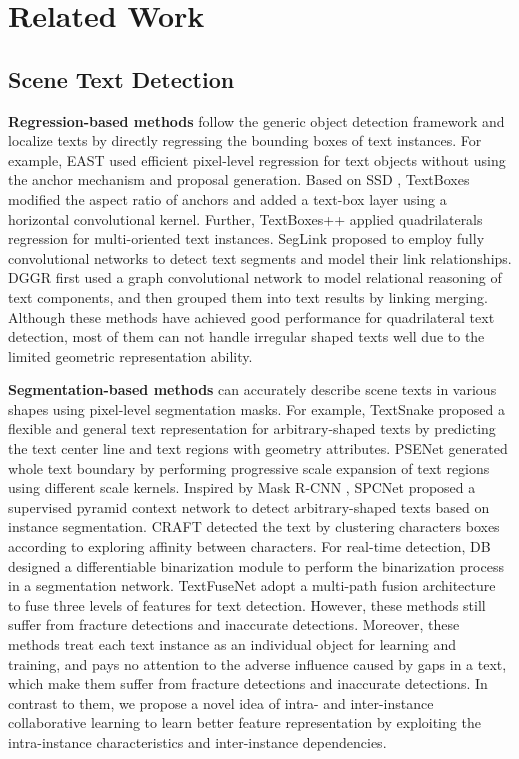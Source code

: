 \section{Related Work}
\subsection{Scene Text Detection}

\textbf{Regression-based methods} follow the generic object detection framework and localize texts by directly regressing the bounding boxes of text instances. For example, EAST \citep{east} used efficient pixel-level regression for text objects without using the anchor mechanism and proposal generation. Based on SSD \citep{ssd}, TextBoxes \citep{textboxes} modified the aspect ratio of anchors and added a text-box layer using a horizontal convolutional kernel. Further, TextBoxes++ \citep{textboxes++} applied quadrilaterals regression for multi-oriented text instances. SegLink \citep{seglink} proposed to employ fully convolutional networks to detect text segments and model their link relationships. DGGR \citep{dggrn} first used a graph convolutional network to model relational reasoning of text components, and then grouped them into text results by linking merging. Although these methods have achieved good performance for quadrilateral text detection, most of them can not handle irregular shaped texts well due to the limited geometric representation ability.


\textbf{Segmentation-based methods} can accurately describe scene texts in various shapes using pixel-level segmentation masks. For example, TextSnake \citep{textsnake} proposed a flexible and general text representation for arbitrary-shaped texts by predicting the text center line and text regions with geometry attributes. PSENet \citep{psenet} generated whole text boundary by performing progressive scale expansion of text regions using different scale kernels. Inspired by Mask R-CNN \citep{maskrcnn}, SPCNet \citep{spcnet} proposed a supervised pyramid context network to detect arbitrary-shaped texts based on instance segmentation. CRAFT \citep{craft} detected the text by clustering characters boxes according to exploring affinity between characters. For real-time detection, DB \citep{db} designed a differentiable binarization module to perform the binarization process in a segmentation network. TextFuseNet \citep{textfusenet} adopt a multi-path fusion architecture to fuse three levels of features for text detection. However, these methods still suffer from fracture detections and inaccurate detections. Moreover, these methods treat each text instance as an individual object for learning and training, and pays no attention to the adverse influence caused by gaps in a text, which make them suffer from fracture detections and inaccurate detections. In contrast to them, we propose a novel idea of intra- and inter-instance collaborative learning to learn better feature representation by exploiting the intra-instance characteristics and inter-instance dependencies.

